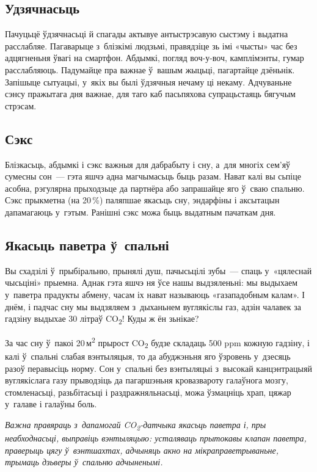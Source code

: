 \subsection*{Удзячнасьць}

Пачуцьцё ўдзячнасьці й спагады актывуе антыстрэсавую сыстэму і выдатна расслабляе. Пагаварыце з~блізкімі людзьмі, правядзіце зь імі «чысты» час без адцягненьня ўвагі на смартфон. Абдымкі, погляд воч-у-воч, камплімэнты, гумар расслабляюць. Падумайце пра важнае ў~вашым жыцьці, пагартайце дзёньнік. Запішыце сытуацыі, у~якіх вы былі ўдзячныя нечаму ці некаму. Адчуваньне сэнсу пражытага дня важнае, для таго каб пасьпяхова супрацьстаяць бягучым стрэсам.

\subsection*{Сэкс}

Блізкасьць, абдымкі і сэкс важныя для дабрабыту і сну, а~для многіх сем'яў сумесны сон~--- гэта яшчэ адна магчымасьць быць разам. Нават калі вы сьпіце асобна, рэгулярна прыходзьце да партнёра або запрашайце яго ў~сваю спальню. Сэкс прыкметна (на 20\,\%) паляпшае якасьць сну, эндарфіны і аксытацын дапамагаюць у~гэтым. Ранішні сэкс можа быць выдатным пачаткам дня.

\subsection*{Якасьць паветра ў~спальні}

Вы схадзілі ў~прыбіральню, прынялі душ, пачысьцілі зубы~--- спаць у~«цялеснай чысьціні» прыемна. Аднак гэта яшчэ ня ўсе нашы выдзяленьні: мы выдыхаем у~паветра прадукты абмену, часам іх нават называюць «газападобным калам». І днём, і падчас сну мы выдзяляем з~дыханьнем вуглякіслы газ, адзін чалавек за гадзіну выдыхае 30 літраў CO\textsubscript{2}! Куды ж ён зьнікае?

За час сну ў~пакоі 20\,м\textsuperscript{2} прырост CO\textsubscript{2} будзе складаць 500 ppm кожную гадзіну, і калі ў~спальні слабая вэнтыляцыя, то да абуджэньня яго ўзровень у~дзесяць разоў перавысіць норму. Сон у~спальні без вэнтыляцыі з~высокай канцэнтрацыяй вуглякіслага газу прыводзіць да пагаршэньня кровазвароту галаўнога мозгу, стомленасьці, разьбітасьці і раздражняльнасьці, можа ўзмацніць храп, цяжар у~галаве і галаўны боль.

\emph{Важна правяраць з~дапамогай CO\textsubscript{2}-датчыка якасьць паветра і, пры неабходнасьці, выправіць вэнтыляцыю: усталяваць прытокавы клапан паветра, праверыць цягу ў~вэнтшахтах, адчыняць акно на мікраправетрываньне, трымаць дзьверы ў~спальню адчыненымі.}

